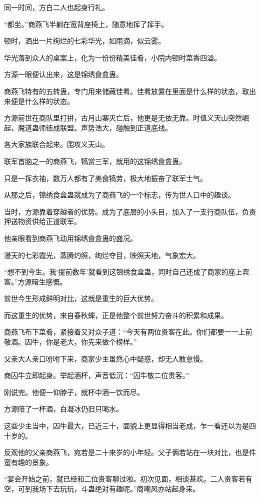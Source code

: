 \begin{this_body}
同一时间，方白二人也起身行礼。

“都坐。”商燕飞半躺在宽背座椅上，随意地挥了挥手。

顿时，洒出一片绚烂的七彩华光，如雨滴，似云雾。

华光落到众人的桌案上，化为一份份精美佳肴，小院内顿时菜香四溢。

方源一眼便认出来，这是锦绣食盒蛊。

商燕飞特有的五转蛊，专门用来储藏佳肴。佳肴放置在里面是什么样的状态，取出来便是什么样的状态。

方源前世在商队里打拼，古月山寨灭亡后，他更是无依无靠。时值义天山突然崛起，魔道蛊师结成联盟。声势浩大，碰触到正道底线。

各大家族联合起来。围攻义天山。

联军首脑之一的商燕飞，犒赏三军，就用的这锦绣食盒蛊。

只是一挥衣袖，数万人都有了美食犒劳，极大地振奋了联军士气。

从那之后，锦绣食盒蛊就成为了商燕飞的一个标志，传为世人口中的趣谈。

当时，方源靠着穿越者的优势。成为了底层的小头目，加入了一支行商队伍，负责押送物资供给正道联军。

他亲眼看到商燕飞动用锦绣食盒蛊的盛况。

漫天的七彩霞光，蒸腾灼照，绚烂夺目，映照天地，气象宏大。

“想不到今生。我‘提前数年’就看到这锦绣食盒蛊，同时自己还成了商家的座上宾客。”方源暗生感慨。

前世今生形成鲜明对比，这就是重生的巨大优势。

而这重生的优势，来自春秋蝉，正是他整个前世努力奋斗的积累和成果。

商燕飞布下菜肴，紧接着又对众子道：“今天有两位贵客在此。你们都要一一上前敬酒。囚牛，你是老大，你先来做个榜样。”

父亲大人亲口吩咐下来，商家少主虽然心中疑惑，却无人敢怠慢。

商囚牛立即起身。举起酒杯，声音低沉：“囚牛敬二位贵客。”

刚说完。他便一仰脖子，就杯中酒一饮而尽。

方源陪了一杯酒，白凝冰仍旧只喝水。

这些少主当中，囚牛最大，已近三十，面貌上更显得相当老成，乍一看还以为是四十岁的。

反观他的父亲商燕飞，宛若是二十来岁的小年轻。父子俩若站在一块对比，也是件蛮有趣的景象。

“宴会开始之前，就已经和二位贵客聊过啦。初次见面，相谈甚欢。二人贵客若有空，可到我场下去玩玩，斗蛊绝对有趣呢。”商嘲风亦站起身来。


\end{this_body}

